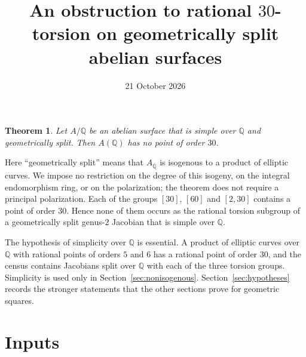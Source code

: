 \documentclass[11pt]{article}
\title{An obstruction to rational \(30\)-torsion on geometrically split
abelian surfaces}
\author{}
\date{21 October 2026}
\newtheorem*{mainthm}{Theorem}
\newcommand{\Q}{\mathbb Q}
\begin{document}
\maketitle

\begin{mainthm}
Let \(A/\Q\) be an abelian surface that is simple over \(\Q\) and
geometrically split. Then \(A(\Q)\) has no point of order \(30\).
\end{mainthm}

Here ``geometrically split'' means that \(A_{\overline{\Q}}\) is
isogenous to a product of elliptic curves. We impose no restriction on
the degree of this isogeny, on the integral endomorphism ring, or on the
polarization; the theorem does not require a principal polarization.
Each of the groups \([30]\), \([60]\) and \([2,30]\) contains a point of
order \(30\). Hence none of them occurs as the rational torsion subgroup
of a geometrically split genus-\(2\) Jacobian that is simple over
\(\Q\).

The hypothesis of simplicity over \(\Q\) is essential. A product of
elliptic curves over \(\Q\) with rational points of orders \(5\) and
\(6\) has a rational point of order \(30\), and the census contains
Jacobians split over \(\Q\) with each of the three torsion groups.
Simplicity is used only in Section~\ref{sec:nonisogenous}.
Section~\ref{sec:hypotheses} records the stronger statements that the
other sections prove for geometric squares.

\section{Inputs}\label{sec:inputs}
\end{document}
